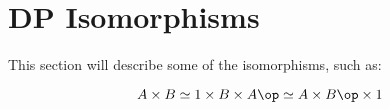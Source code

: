 

\section{DP Isomorphisms}

\begin{publictodo}
    This section will describe some of the isomorphisms, such as:
    
    \begin{equation}
        A \times B \simeq 1 \times B \times A\op \simeq A \times B\op \times 1
    \end{equation}

\end{publictodo}

